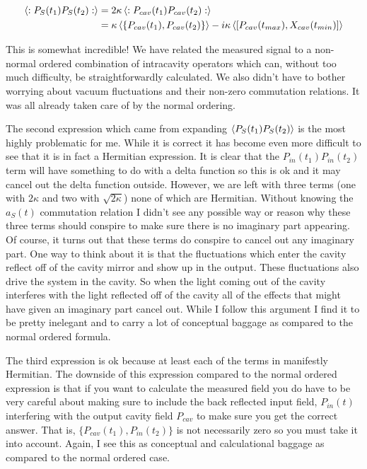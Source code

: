 \documentclass[12pt]{article}
\begin{document}
\begin{align}
\Braket{:P_S(t_1)P_S(t_2):} &= 2\kappa\Braket{:P_{cav}(t_1)P_{cav}(t_2):}\\
&= \kappa \Braket{\{P_{cav}(t_1),P_{cav}(t_2)\}} - i \kappa\Braket{[P_{cav}(t_{max}),X_{cav}(t_{min})]}
\end{align}

This is somewhat incredible! We have related the measured signal to a non-normal ordered combination of intracavity operators which can, without too much difficulty, be straightforwardly calculated. We also didn't have to bother worrying about vacuum fluctuations and their non-zero commutation relations. It was all already taken care of by the normal ordering.

The second expression which came from expanding $\Braket{P_S(t_1)P_S(t_2)}$ is the most highly problematic for me. While it is correct it has become even more difficult to see that it is in fact a Hermitian expression. It is clear that the $P_{in}(t_1)P_{in}(t_2)$ term will have something to do with a delta function so this is ok and it may cancel out the delta function outside. However, we are left with three terms (one with $2\kappa$ and two with $\sqrt{2\kappa}$) none of which are Hermitian. Without knowing the $a_S(t)$ commutation relation I didn't see any possible way or reason why these three terms should conspire to make sure there is no imaginary part appearing. Of course, it turns out that these terms do conspire to cancel out any imaginary part. One way to think about it is that the fluctuations which enter the cavity reflect off of the cavity mirror and show up in the output. These fluctuations also drive the system in the cavity. So when the light coming out of the cavity interferes with the light reflected off of the cavity all of the effects that might have given an imaginary part cancel out. While I follow this argument I find it to be pretty inelegant and to carry a lot of conceptual baggage as compared to the normal ordered formula.

The third expression is ok because at least each of the terms in manifestly Hermitian. The downside of this expression compared to the normal ordered expression is that if you want to calculate the measured field you do have to be very careful about making sure to include the back reflected input field, $P_{in}(t)$ interfering with the output cavity field $P_{cav}$ to make sure you get the correct answer. That is, $\{P_{cav}(t_1),P_{in}(t_2)\}$ is not necessarily zero so you must take it into account. Again, I see this as conceptual and calculational baggage as compared to the normal ordered case.
\end{document}

